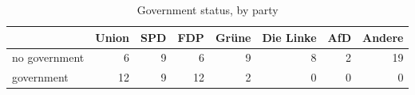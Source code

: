 \begin{table*}[t!]
\centering
\caption{Government status, by party} 
\begingroup\small
\begin{tabular}{lrrrrrrr}
  \toprule
 & Union & SPD & FDP & Grüne & Die Linke & AfD & Andere \\ 
  \midrule
no government & 6 & 9 & 6 & 9 & 8 & 2 & 19 \\ 
  government & 12 & 9 & 12 & 2 & 0 & 0 & 0 \\ 
   \bottomrule
\end{tabular}
\endgroup
\end{table*}
